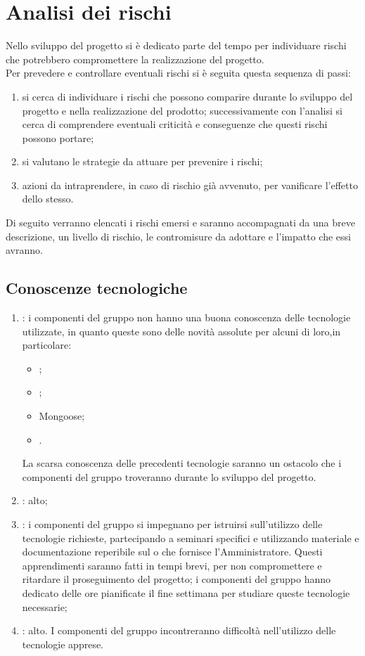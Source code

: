 \section{Analisi dei rischi}
Nello sviluppo del progetto si è dedicato parte del tempo per individuare rischi che potrebbero compromettere la realizzazione del progetto.\\
Per prevedere e controllare eventuali rischi si è seguita questa sequenza di passi:
\begin{enumerate}
\item {} si cerca di individuare i rischi che possono comparire durante lo sviluppo del progetto e nella realizzazione del prodotto; successivamente con l'analisi si cerca di comprendere eventuali criticità e conseguenze che questi rischi possono portare;
\item {} si valutano le strategie da attuare  per prevenire i rischi;
\item {} azioni da intraprendere, in caso di rischio già avvenuto, per vanificare l'effetto dello stesso.
\end{enumerate}
Di seguito verranno elencati i rischi emersi e saranno accompagnati da una breve descrizione, un livello di rischio, le contromisure da adottare e l'impatto che essi avranno.

\subsection{Conoscenze tecnologiche}
\begin{enumerate}
\item {}: i componenti del gruppo non hanno una buona conoscenza delle tecnologie utilizzate, in quanto queste sono delle novità assolute per alcuni di loro,in particolare:
\begin{itemize}
\item {};
\item {};
\item Mongoose;
\item {}.
\end{itemize}
La scarsa conoscenza delle precedenti tecnologie saranno un ostacolo che i componenti del gruppo troveranno durante lo sviluppo del progetto.
\item {}: alto;
\item {}: i componenti del gruppo si impegnano per istruirsi sull'utilizzo delle tecnologie richieste, partecipando a seminari specifici e utilizzando materiale e documentazione reperibile sul  o che fornisce l'Amministratore. Questi apprendimenti saranno fatti in tempi brevi, per non compromettere e ritardare il proseguimento del progetto; i componenti del gruppo hanno dedicato delle ore pianificate il fine settimana per studiare queste tecnologie necessarie;
\item {}: alto. I componenti del gruppo incontreranno difficoltà nell'utilizzo delle tecnologie apprese.
\end{enumerate}

